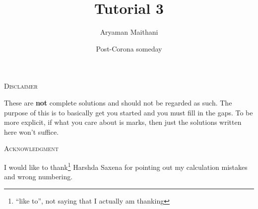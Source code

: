 \documentclass{article}
\title{Tutorial 3}				%
\author{Aryaman Maithani}
\date{Post-Corona someday}		%
\begin{document}
\maketitle

\hrulefill

\begin{center}
	\textsc{Disclaimer}
\end{center}
These are \textbf{not} complete solutions and should not be regarded as such. The purpose of this is to basically get you started and you must fill in the gaps. To be more explicit, if what you care about is marks, then just the solutions written here won't suffice.

\hrulefill
\begin{center}
	\textsc{Acknowledgment}
\end{center}
I would like to thank\footnote{``like to'', not saying that I actually am thanking} Harshda Saxena for pointing out my calculation mistakes and wrong numbering.

\hrulefill
\end{document}
